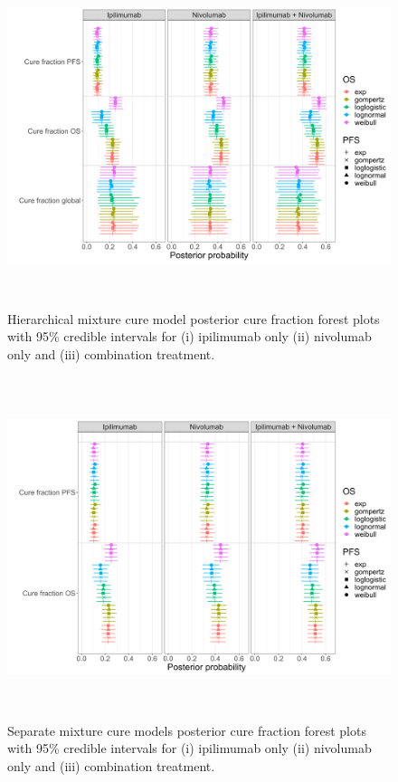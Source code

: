 \documentclass[AMA,STIX1COL]{WileyNJD-v2}
\begin{document}
\begin{figure}[hbt!]
\centering
\includegraphics[height=10cm, width=0.9\linewidth]{forest_plot_multimcm.png}
\caption{\label{fig:cf_forest_all_tx} Hierarchical mixture cure model posterior cure fraction forest plots with 95\% credible intervals for (i) ipilimumab only (ii) nivolumab only and (iii) combination treatment.}
\end{figure}

\begin{figure}[hbt!]
\centering
\includegraphics[height=10cm, width=0.9\linewidth]{forest_plot_sep_multimcm.png}
\caption{\label{fig:cf_forest_all_tx_sep} Separate mixture cure models posterior cure fraction forest plots with 95\% credible intervals for (i) ipilimumab only (ii) nivolumab only and (iii) combination treatment.}
\end{figure}
\end{document}
